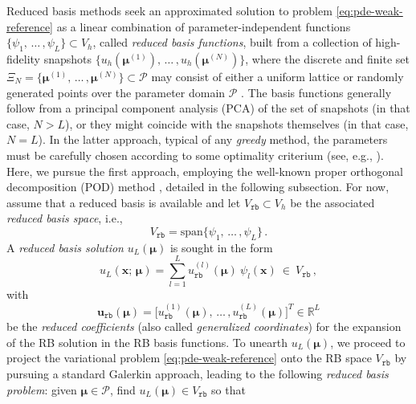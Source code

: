\documentclass{elsarticle}
\numberwithin{equation}{section}
\theoremstyle{theorem}
\theoremstyle{definition}
\theoremstyle{remark}
\theoremstyle{proposition}
\numberwithin{figure}{section}
\newcommand{\bg}[1]{\boldsymbol{#1}}
\begin{document}
		Reduced basis methods seek an approximated solution to problem \eqref{eq:pde-weak-reference} as a linear combination of parameter-independent functions $\big\lbrace \psi_1, \, \ldots \, , \psi_L \big\rbrace \subset V_h$, called \emph{reduced basis functions}, built from a collection of high-fidelity snapshots $\big\lbrace u_h \left( \bg{\mu}^{(1)} \right), \, \ldots \, , u_h \left( \bg{\mu}^{(N)} \right) \big\rbrace$, where the discrete and finite set $\Xi_N = \big\lbrace \bg{\mu}^{(1)}, \, \ldots \, , \bg{\mu}^{(N)} \big\rbrace \subset \mathcal{P}$ may consist of either a uniform lattice or randomly generated points over the parameter domain $\mathcal{P}$ \cite{HSR16}. The basis functions  generally follow from a principal component analysis (PCA) of the set of snapshots (in that case, $N > L$), or they might coincide with the snapshots themselves (in that case, $N = L$). In the latter approach, typical of any \emph{greedy} method, the parameters \smash{$\big\lbrace \bg{\mu}^{(n)} \big\rbrace_{1 \leq n \leq N}$} must be carefully chosen according to some optimality criterium (see, e.g., \cite{Chen17}). Here, we pursue the first approach, employing the well-known proper orthogonal decomposition (POD) method \cite{Lia02, Vol08}, detailed in the following subsection. For now, assume that a reduced basis is available and let $V_{\texttt{rb}} \subset V_h$ be the associated \emph{reduced basis space}, i.e.,
		\begin{equation*}
			V_{\texttt{rb}} = \text{span} \big\lbrace \psi_1, \, \ldots \, , \psi_L \big\rbrace \, .
		\end{equation*} 
		A \emph{reduced basis solution} $u_{L}(\bg{\mu})$ is sought in the form
		\begin{equation*}
			\label{eq:rb-solution}
			u_{L}(\bg{x}; \, \bg{\mu}) = \sum_{l = 1}^L u_{\texttt{rb}}^{(l)}(\bg{\mu}) ~ \psi_l(\bg{x}) ~ \in ~ V_{\texttt{rb}} \, ,
		\end{equation*}
		with \[ \mathbf{u}_{\texttt{rb}}(\bg{\mu}) = \big[ u_{\texttt{rb}}^{(1)}(\bg{\mu}), \, \ldots \, , u_{\texttt{rb}}^{(L)}(\bg{\mu}) \big]^T \in \mathbb{R}^L \] be the \emph{reduced coefficients} (also called \emph{generalized coordinates}) for the expansion of the RB solution in the RB basis functions. To unearth $u_L(\bg{\mu})$, we proceed to project the variational problem \eqref{eq:pde-weak-reference} onto the RB space $V_{\texttt{rb}}$ by pursuing a standard Galerkin approach, leading to the following \emph{reduced basis problem}: given $\bg{\mu} \in \mathcal{P}$, find $u_L(\bg{\mu}) \in V_{\texttt{rb}}$ so that
\end{document}
